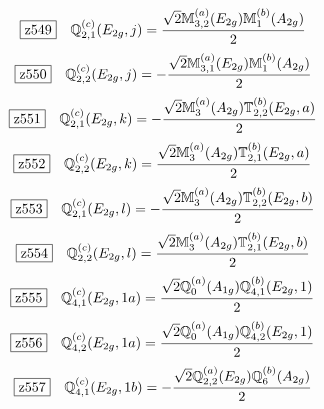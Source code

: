 \documentclass[fleqn,10pt,landscape]{jsarticle}
\begin{document}
\begin{dmath*}
\hspace*{3mm}\fbox{z549}\quad \mathbb{Q}_{2,1}^{(c)}(E_{2g},j)=\frac{\sqrt{2} \mathbb{M}_{3,2}^{(a)}(E_{2g}) \mathbb{M}_{1}^{(b)}(A_{2g})}{2}
\end{dmath*}
\begin{dmath*}
\hspace*{3mm}\fbox{z550}\quad \mathbb{Q}_{2,2}^{(c)}(E_{2g},j)=- \frac{\sqrt{2} \mathbb{M}_{3,1}^{(a)}(E_{2g}) \mathbb{M}_{1}^{(b)}(A_{2g})}{2}
\end{dmath*}
\begin{dmath*}
\hspace*{3mm}\fbox{z551}\quad \mathbb{Q}_{2,1}^{(c)}(E_{2g},k)=- \frac{\sqrt{2} \mathbb{M}_{3}^{(a)}(A_{2g}) \mathbb{T}_{2,2}^{(b)}(E_{2g},a)}{2}
\end{dmath*}
\begin{dmath*}
\hspace*{3mm}\fbox{z552}\quad \mathbb{Q}_{2,2}^{(c)}(E_{2g},k)=\frac{\sqrt{2} \mathbb{M}_{3}^{(a)}(A_{2g}) \mathbb{T}_{2,1}^{(b)}(E_{2g},a)}{2}
\end{dmath*}
\begin{dmath*}
\hspace*{3mm}\fbox{z553}\quad \mathbb{Q}_{2,1}^{(c)}(E_{2g},l)=- \frac{\sqrt{2} \mathbb{M}_{3}^{(a)}(A_{2g}) \mathbb{T}_{2,2}^{(b)}(E_{2g},b)}{2}
\end{dmath*}
\begin{dmath*}
\hspace*{3mm}\fbox{z554}\quad \mathbb{Q}_{2,2}^{(c)}(E_{2g},l)=\frac{\sqrt{2} \mathbb{M}_{3}^{(a)}(A_{2g}) \mathbb{T}_{2,1}^{(b)}(E_{2g},b)}{2}
\end{dmath*}
\begin{dmath*}
\hspace*{3mm}\fbox{z555}\quad \mathbb{Q}_{4,1}^{(c)}(E_{2g},1a)=\frac{\sqrt{2} \mathbb{Q}_{0}^{(a)}(A_{1g}) \mathbb{Q}_{4,1}^{(b)}(E_{2g},1)}{2}
\end{dmath*}
\begin{dmath*}
\hspace*{3mm}\fbox{z556}\quad \mathbb{Q}_{4,2}^{(c)}(E_{2g},1a)=\frac{\sqrt{2} \mathbb{Q}_{0}^{(a)}(A_{1g}) \mathbb{Q}_{4,2}^{(b)}(E_{2g},1)}{2}
\end{dmath*}
\begin{dmath*}
\hspace*{3mm}\fbox{z557}\quad \mathbb{Q}_{4,1}^{(c)}(E_{2g},1b)=- \frac{\sqrt{2} \mathbb{Q}_{2,2}^{(a)}(E_{2g}) \mathbb{Q}_{6}^{(b)}(A_{2g})}{2}
\end{dmath*}
\end{document}
